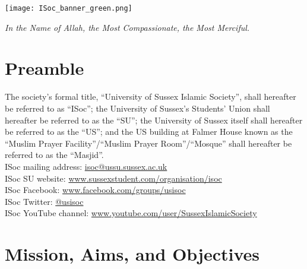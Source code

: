 \documentclass[12pt]{article}
\begin{document}
\title{}
\author{Ridwan Barbhuiyan [r.barbhuiyan@sussex.ac.uk]}
\date{}
\maketitle

\vfill
\begin{center}
\texttt{[image: ISoc\_banner\_green.png]}
\end{center}


\newpage
\setcounter{tocdepth}{2}
\tableofcontents
\newpage

\begin{center}
\emph{In the Name of Allah, the Most Compassionate, the Most Merciful.}\\
\end{center}
\section*{Preamble}
The society's formal title, ``University of Sussex Islamic Society'', shall hereafter be referred to as ``ISoc''; the University of Sussex's Students' Union shall hereafter be referred to as the ``SU''; the University of Sussex itself shall hereafter be referred to as the ``US''; and the US building at Falmer House known as the ``Muslim Prayer Facility''/``Muslim Prayer Room''/``Mosque'' shall hereafter be referred to as the ``Masjid''.\\

ISoc mailing address: \href{mailto:isoc@ussu.sussex.ac.uk}{isoc@ussu.sussex.ac.uk}\\
ISoc SU website: \href{www.sussexstudent.com/organisation/isoc}{www.sussexstudent.com/organisation/isoc}\\
ISoc Facebook: \href{www.facebook.com/groups/usisoc}{www.facebook.com/groups/usisoc}\\
ISoc Twitter: \href{http://www.twitter.com/usisoc}{@usisoc}\\
ISoc YouTube channel: \href{www.youtube.com/user/SussexIslamicSociety}{www.youtube.com/user/SussexIslamicSociety}\\


\section{Mission, Aims, and Objectives}
\end{document}
